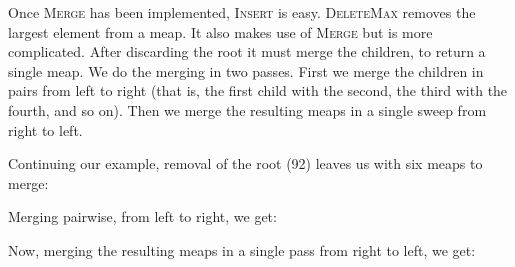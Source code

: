 \documentclass[11pt]{article}
\begin{document}
\vspace{1ex}\noindent
Once \textsc{Merge} has been implemented, \textsc{Insert} is easy.
\textsc{DeleteMax} removes the largest element from a meap.
It also makes use of \textsc{Merge} but is more complicated.
After discarding the root it must merge the children, to return a
single meap.
We do the merging in two passes.
First we merge the children in pairs from left to right
(that is, the first child with the second, the third with the fourth, 
and so on).
Then we merge the resulting meaps in a single sweep from right to left.

Continuing our example, removal of the root (92) leaves us with 
six meaps to merge:
\begin{center}
  \quad
  \quad
  \qquad
  \qquad
  \qquad
\end{center}

\vspace{1ex}\noindent
Merging pairwise, from left to right, we get:
\begin{center}
  \quad
  \qquad
\end{center}

\pagebreak
\noindent
Now, merging the resulting meaps in a single pass from right to left,
we get:
\begin{center}
\end{center}
\end{document}
